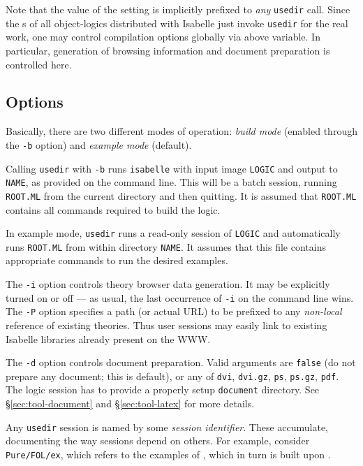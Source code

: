 Note that the value of the  setting is
implicitly prefixed to \emph{any} \texttt{usedir} call. Since the
s of all object-logics distributed with Isabelle just
invoke \texttt{usedir} for the real work, one may control compilation options
globally via above variable. In particular, generation of 
browsing information and document preparation is controlled here.


\subsection*{Options}

Basically, there are two different modes of operation: \emph{build mode}
(enabled through the \texttt{-b} option) and \emph{example mode} (default).

Calling \texttt{usedir} with \texttt{-b} runs \texttt{isabelle} with input
image \texttt{LOGIC} and output to \texttt{NAME}, as provided on the command
line. This will be a batch session, running \texttt{ROOT.ML} from the current
directory and then quitting.  It is assumed that \texttt{ROOT.ML} contains all
{\ML} commands required to build the logic.

In example mode, \texttt{usedir} runs a read-only session of \texttt{LOGIC}
and automatically runs \texttt{ROOT.ML} from within directory \texttt{NAME}.
It assumes that this file contains appropriate {\ML} commands to run the
desired examples.

\medskip The \texttt{-i} option controls theory browser data generation. It
may be explicitly turned on or off --- as usual, the last occurrence of
\texttt{-i} on the command line wins.  The \texttt{-P} option specifies a path
(or actual URL) to be prefixed to any \emph{non-local} reference of existing
theories.  Thus user sessions may easily link to existing Isabelle libraries
already present on the WWW.

\medskip The \texttt{-d} option controls document preparation.  Valid
arguments are \texttt{false} (do not prepare any document; this is default),
or any of \texttt{dvi}, \texttt{dvi.gz}, \texttt{ps}, \texttt{ps.gz},
\texttt{pdf}.  The logic session has to provide a properly setup
\texttt{document} directory.  See \S\ref{sec:tool-document} and
\S\ref{sec:tool-latex} for more details.

\medskip Any \texttt{usedir} session is named by some \emph{session
  identifier}. These accumulate, documenting the way sessions depend on
others. For example, consider \texttt{Pure/FOL/ex}, which refers to the
examples of {\FOL}, which in turn is built upon {\Pure}.

